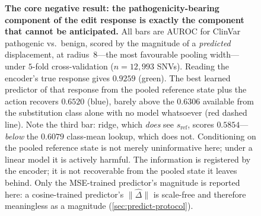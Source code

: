 {\begin{figure}[t]
  \caption{\textbf{The core negative result: the pathogenicity-bearing component of the edit
  response is exactly the component that cannot be anticipated.} All bars are AUROC for ClinVar
  pathogenic vs.\ benign, scored by the magnitude of a \emph{predicted} displacement, at
  radius~$8$---the most favourable pooling width---under $5$-fold cross-validation
  ($n{=}12{,}993$ SNVs). Reading the encoder's true response gives $0.9259$ (green). The best
  learned predictor of that response from the pooled reference state plus the action recovers
  $0.6520$ (blue), barely above the $0.6306$ available from the substitution class alone with no
  model whatsoever (red dashed line). Note the third bar: ridge, which \emph{does} see
  $s_{\mathrm{ref}}$, scores $0.5854$---\emph{below} the $0.6079$ class-mean lookup, which does
  not. Conditioning on the pooled reference state is not merely uninformative here; under a
  linear model it is actively harmful. The information is registered by the encoder; it is not
  recoverable from the pooled state it leaves behind. Only the MSE-trained predictor's magnitude
  is reported here: a cosine-trained predictor's $\lVert\hat\Delta\rVert$ is scale-free and
  therefore meaningless as a magnitude (\cref{sec:predict-protocol}).}
  \label{fig:predict}
\end{figure}}

